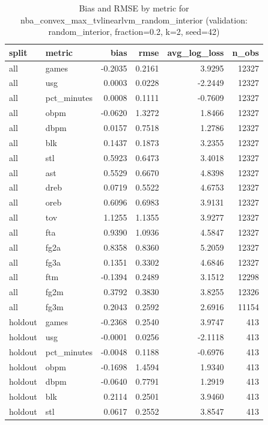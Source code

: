 \begin{table}
\caption{Bias and RMSE by metric for nba_convex_max_tvlinearlvm_random_interior (validation: random_interior, fraction=0.2, k=2, seed=42)}
\label{tab:nba_convex_max_tvlinearlvm_random_interior_vs_random_interior_f20_k2_s42_bias_rmse}
\begin{tabular}{llrrrr}
\toprule
split & metric & bias & rmse & avg\_log\_loss & n\_obs \\
\midrule
all & games & -0.2035 & 0.2161 & 3.9295 & 12327 \\
all & usg & 0.0003 & 0.0228 & -2.2449 & 12327 \\
all & pct\_minutes & 0.0008 & 0.1111 & -0.7609 & 12327 \\
all & obpm & -0.0620 & 1.3272 & 1.8466 & 12327 \\
all & dbpm & 0.0157 & 0.7518 & 1.2786 & 12327 \\
all & blk & 0.1437 & 0.1873 & 3.2355 & 12327 \\
all & stl & 0.5923 & 0.6473 & 3.4018 & 12327 \\
all & ast & 0.5529 & 0.6670 & 4.8398 & 12327 \\
all & dreb & 0.0719 & 0.5522 & 4.6753 & 12327 \\
all & oreb & 0.6096 & 0.6983 & 3.9131 & 12327 \\
all & tov & 1.1255 & 1.1355 & 3.9277 & 12327 \\
all & fta & 0.9390 & 1.0936 & 4.5847 & 12327 \\
all & fg2a & 0.8358 & 0.8360 & 5.2059 & 12327 \\
all & fg3a & 0.1351 & 0.3302 & 4.6846 & 12327 \\
all & ftm & -0.1394 & 0.2489 & 3.1512 & 12298 \\
all & fg2m & 0.3792 & 0.3830 & 3.8255 & 12326 \\
all & fg3m & 0.2043 & 0.2592 & 2.6916 & 11154 \\
holdout & games & -0.2368 & 0.2540 & 3.9747 & 413 \\
holdout & usg & -0.0001 & 0.0256 & -2.1118 & 413 \\
holdout & pct\_minutes & -0.0048 & 0.1188 & -0.6976 & 413 \\
holdout & obpm & -0.1698 & 1.4594 & 1.9340 & 413 \\
holdout & dbpm & -0.0640 & 0.7791 & 1.2919 & 413 \\
holdout & blk & 0.2114 & 0.2501 & 3.9460 & 413 \\
holdout & stl & 0.0617 & 0.2552 & 3.8547 & 413 \\

\end{tabular}
\end{table}
